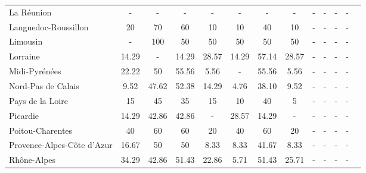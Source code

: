 \begin{table}[H]
\begin{tabularx}{\textwidth}{Xcccccccccccc}
            La Réunion  & - & - & - & - & - & - & - & - & - & - & - \\
            Languedoc-Roussillon & 20 & 70 & 60 & 10 & 10 & 40 & 10 & - & - & - & - \\
            Limousin & - & 100 & 50 & 50 & 50 & 50 & 50 & - & - & - & - \\
            Lorraine & 14.29 & - & 14.29 & 28.57 & 14.29 & 57.14 & 28.57 & - & - & - & - \\
            Midi-Pyrénées & 22.22 & 50 & 55.56 & 5.56 & - & 55.56 & 5.56 & - & - & - & - \\
            Nord-Pas de Calais & 9.52 & 47.62 & 52.38 & 14.29 & 4.76 & 38.10 & 9.52 & - & - & - & - \\
            Pays de la Loire & 15 & 45 & 35 & 15 & 10 & 40 & 5 & - & - & - & - \\
            Picardie & 14.29 & 42.86 & 42.86 & - & 28.57 & 14.29 & - & - & - & - & - \\
            Poitou-Charentes & 40 & 60 & 60 & 20 & 40 & 60 & 20 & - & - & - & - \\
            Provence-Alpes-Côte d’Azur & 16.67 & 50 & 50 & 8.33 & 8.33 & 41.67 & 8.33 & - & - & - & - \\
            Rhône-Alpes & 34.29 & 42.86 & 51.43 & 22.86 & 5.71 & 51.43 & 25.71 & - & - & - & - \\
        \bottomrule
    \end{tabularx}
\end{table}
    